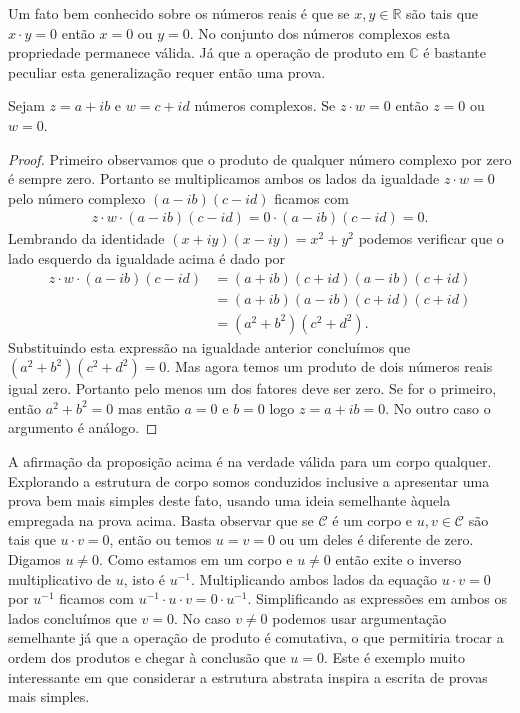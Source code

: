 Um fato bem conhecido sobre os números reais é que se $x,y\in\mathbb{R}$ são tais 
que $x\cdot y=0$ então $x=0$ ou $y=0$. No conjunto dos números complexos esta 
propriedade permanece válida. Já que a operação de produto em $\mathbb{C}$ é bastante peculiar
esta generalização requer então uma prova. 

\begin{proposicao}
Sejam $z=a+ib$ e $w=c+id$ números complexos. 
Se $z\cdot w= 0$ então $z=0$ ou $w=0$.
\end{proposicao} 

\begin{proof}
Primeiro observamos que o produto de qualquer número complexo por zero é sempre zero.
Portanto se multiplicamos ambos os lados da igualdade $z\cdot w = 0$ pelo número complexo $(a-ib)(c-id)$
ficamos com 
\begin{align*}
z\cdot w\cdot (a-ib)(c-id) = 0\cdot (a-ib)(c-id) =0.
\end{align*}
Lembrando da identidade $(x+iy)(x-iy) = x^2+y^2$ podemos verificar que o lado esquerdo da igualdade acima
é dado por 
\begin{align*}
z\cdot w\cdot (a-ib)(c-id)
&=
(a+ib)(c+id) (a-ib)(c+id)
\\
&=
(a+ib)(a-ib)(c+id)(c+id)
\\
&=
(a^2+b^2)(c^2+d^2).
\end{align*}
Substituindo esta expressão na igualdade anterior concluímos que  
$(a^2+b^2)(c^2+d^2)=0$. Mas agora temos um produto de dois números reais igual zero.
Portanto pelo menos um dos fatores deve ser zero. Se for o primeiro, então $a^2+b^2=0$
mas então $a=0$ e $b=0$ logo $z=a+ib=0$. No outro caso o argumento é análogo.
\end{proof}


A afirmação da proposição acima é na verdade válida para um corpo qualquer. 
Explorando a estrutura de corpo somos conduzidos inclusive a apresentar uma prova
bem mais simples deste fato, usando uma ideia semelhante àquela empregada na prova 
acima. Basta observar que se $\mathscr{C}$ é um corpo e $u,v\in\mathscr{C}$ são tais 
que $u\cdot v =0$, então ou temos $u=v=0$ ou um deles é diferente de zero. Digamos $u\neq 0$.
Como estamos em um corpo e $u\neq 0$ então exite o inverso multiplicativo de $u$, isto é $u^{-1}$.
Multiplicando ambos lados da equação $u\cdot v =0$ por $u^{-1}$ ficamos com 
$u^{-1}\cdot u\cdot v = 0\cdot u^{-1}$. Simplificando as expressões em ambos os lados
concluímos que $v=0$. No caso $v\neq 0$ podemos usar argumentação semelhante já que a operação 
de produto é comutativa, o que permitiria trocar a ordem dos produtos e chegar à conclusão que $u=0$. 
Este é exemplo muito interessante em que considerar a estrutura abstrata inspira a escrita
de provas mais simples. 

